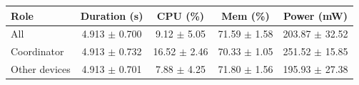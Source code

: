 \begin{tabular}{lcccc}
\hline
\textbf{Role} & \textbf{Duration (s)} & \textbf{CPU (\%)} & \textbf{Mem (\%)} & \textbf{Power (mW)} \\
\hline
All & 4.913 $\pm$ 0.700 & 9.12 $\pm$ 5.05 & 71.59 $\pm$ 1.58 & 203.87 $\pm$ 32.52 \\
Coordinator & 4.913 $\pm$ 0.732 & 16.52 $\pm$ 2.46 & 70.33 $\pm$ 1.05 & 251.52 $\pm$ 15.85 \\
Other devices & 4.913 $\pm$ 0.701 & 7.88 $\pm$ 4.25 & 71.80 $\pm$ 1.56 & 195.93 $\pm$ 27.38 \\
\hline
\end{tabular}
